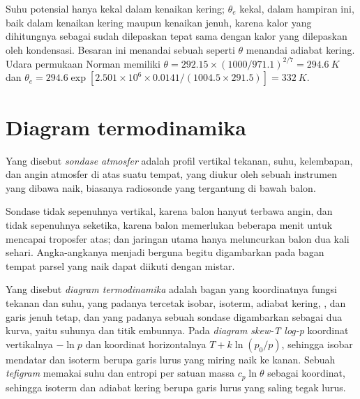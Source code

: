 Suhu potensial hanya kekal dalam kenaikan kering; $\theta_e$ kekal, dalam
hampiran ini, baik dalam kenaikan kering maupun kenaikan jenuh, karena kalor yang dihitungnya sebagai sudah dilepaskan
tepat sama dengan kalor yang dilepaskan oleh kondensasi. Besaran ini menandai sebuah  seperti $\theta$ menandai adiabat kering.
Udara permukaan Norman memiliki $\theta = 292.15 \times (1000/971.1)^{2/7} = \qty{294.6}{K}$ dan
$\theta_e = 294.6 \exp[2.501 \times 10^6 \times 0.0141/(1004.5 \times 291.5)] = \qty{332}{K}$.

\section{Diagram termodinamika}\label{sec:b2:atmospheric-thermodynamics:diagrams}

\begin{definition}\label{def:b2:atmospheric-thermodynamics:sounding}
Yang disebut \emph{sondase atmosfer} adalah profil vertikal
tekanan, suhu, kelembapan, dan angin atmosfer di atas suatu tempat, yang diukur oleh sebuah
instrumen yang dibawa naik, biasanya radiosonde yang tergantung di bawah balon.
\end{definition}

Sondase tidak sepenuhnya vertikal, karena balon hanyut terbawa angin, dan tidak sepenuhnya
seketika, karena balon memerlukan beberapa menit untuk mencapai troposfer atas; dan jaringan utama
hanya meluncurkan balon dua kali sehari. Angka-angkanya menjadi berguna begitu digambarkan pada bagan
tempat parsel yang naik dapat diikuti dengan mistar.

\begin{definition}\label{def:b2:atmospheric-thermodynamics:diagram}
Yang disebut \emph{diagram termodinamika} adalah bagan yang koordinatnya
fungsi tekanan dan suhu, yang padanya tercetak isobar, isoterm, adiabat kering, , dan garis  jenuh tetap, dan yang padanya sebuah sondase
digambarkan sebagai dua kurva, yaitu suhunya dan titik embunnya. Pada \emph{diagram skew-T log-p}
koordinat vertikalnya $-\ln p$ dan koordinat horizontalnya
$T + k\ln(p_0/p)$, sehingga isobar mendatar dan isoterm berupa garis lurus yang miring naik ke
kanan. Sebuah \emph{tefigram} memakai suhu dan entropi per satuan
massa $c_p\ln\theta$ sebagai koordinat, sehingga isoterm dan adiabat kering berupa garis lurus yang saling
tegak lurus.
\end{definition}

